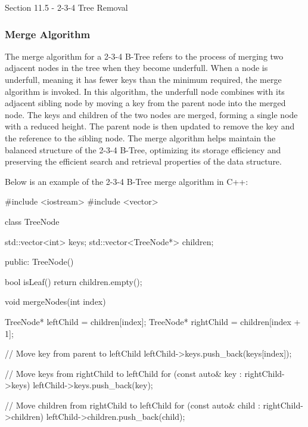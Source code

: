 \begin{notes}{Section 11.5 - 2-3-4 Tree Removal}
    \subsubsection*{Merge Algorithm}

    The merge algorithm for a 2-3-4 B-Tree refers to the process of merging two adjacent nodes in the tree when they become underfull. When a node is underfull, meaning it has fewer keys than the minimum required, the merge algorithm is invoked. In this algorithm, the underfull node combines with its adjacent sibling node by moving a 
    key from the parent node into the merged node. The keys and children of the two nodes are merged, forming a single node with a reduced height. The parent node is then updated to remove the key and the reference to the sibling node. The merge algorithm helps maintain the balanced structure of the 2-3-4 B-Tree, optimizing its storage 
    efficiency and preserving the efficient search and retrieval properties of the data structure.
    
    \begin{highlight}
        Below is an example of the 2-3-4 B-Tree merge algorithm in C++:
    
        \begin{code}[C++]
        #include <iostream>
        #include <vector>
        
        class TreeNode {
            std::vector<int> keys;
            std::vector<TreeNode*> children;
        
        public:
            TreeNode() {}
        
            bool isLeaf() {
                return children.empty();
            }
        
            void mergeNodes(int index) {
                TreeNode* leftChild = children[index];
                TreeNode* rightChild = children[index + 1];
        
                // Move key from parent to leftChild
                leftChild->keys.push_back(keys[index]);
        
                // Move keys from rightChild to leftChild
                for (const auto& key : rightChild->keys) {
                    leftChild->keys.push_back(key);
                }
        
                // Move children from rightChild to leftChild
                for (const auto& child : rightChild->children) {
                    leftChild->children.push_back(child);
                }
        
}}
\end{code}
\end{highlight}
\end{notes}
